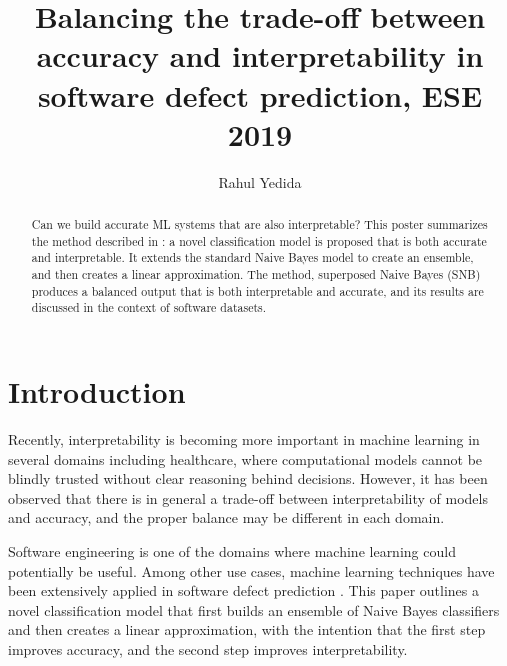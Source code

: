 \documentclass[sigconf]{acmart}
\begin{document}
\title{Balancing the trade-off between accuracy and interpretability in software defect prediction, ESE 2019}
\author{Rahul Yedida}

\begin{abstract}
Can we build accurate ML systems that are also interpretable? This poster summarizes the method described in \cite{mori2019balancing}: a novel classification model is proposed that is both accurate and interpretable. It extends the standard Naive Bayes model to create an ensemble, and then creates a linear approximation. The method, superposed Naive Bayes (SNB) produces a balanced output that is both interpretable and accurate, and its results are discussed in the context of software datasets.
\end{abstract}

\maketitle
{}
\section{Introduction}
Recently, interpretability is becoming more important in machine learning \cite{Ribeiro2016} in several domains including healthcare, where computational models cannot be blindly trusted without clear reasoning behind decisions. However, it has been observed that there is in general a trade-off between interpretability of models and accuracy, and the proper balance may be different in each domain.

Software engineering is one of the domains where machine learning could potentially be useful. Among other use cases, machine learning techniques have been extensively applied in software defect prediction \cite{malhotra2015systematic}. This paper outlines a novel classification model that first builds an ensemble of Naive Bayes classifiers and then creates a linear approximation, with the intention that the first step improves accuracy, and the second step improves interpretability.
\end{document}
